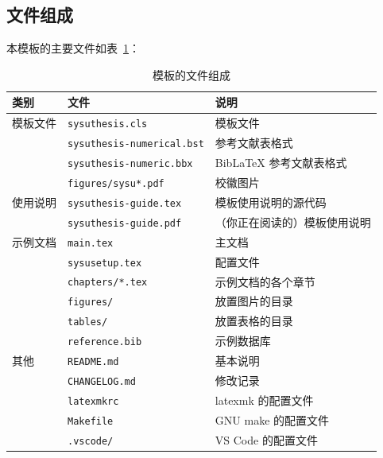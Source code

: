 \documentclass[a4paper]{ltxdoc}
\DeclareRobustCommand\file{\nolinkurl}
\begin{document}
\subsection{文件组成}
本模板的主要文件如表~\ref{tab:files}：
\begin{table}[htb]
  \centering\small
  \caption{模板的文件组成}
  \label{tab:files}
  \begin{tabular}{lll}
    \toprule
    类别     & 文件                      & 说明                         \\
    \midrule
    模板文件 & \file{sysuthesis.cls}     & 模板文件                     \\
             & \file{sysuthesis-numerical.bst}   & \BibTeX{} 参考文献表格式   \\
             & \file{sysuthesis-numeric.bbx}    & BibLaTeX 参考文献表格式  \\
             & \file{figures/sysu*.pdf} & 校徽图片               \\
    \midrule
    使用说明 & \file{sysuthesis-guide.tex} & 模板使用说明的源代码         \\
             & \file{sysuthesis-guide.pdf} & （你正在阅读的）模板使用说明 \\
    \midrule
    示例文档 & \file{main.tex}           & 主文档                       \\
             & \file{sysusetup.tex}      & 配置文件                     \\
             & \file{chapters/*.tex}     & 示例文档的各个章节           \\
             & \file{figures/}           & 放置图片的目录               \\
             & \file{tables/}            & 放置表格的目录               \\
             & \file{reference.bib}       & \BibTeX{} 示例数据库         \\
    \midrule
    其他     & \file{README.md}          & 基本说明                     \\
             & \file{CHANGELOG.md}       & 修改记录                     \\
             & \file{latexmkrc}          & latexmk 的配置文件           \\
             & \file{Makefile}           & GNU make 的配置文件          \\
             & \file{.vscode/}           & VS Code 的配置文件           \\
    \bottomrule
  \end{tabular}
\end{table}
\end{document}
